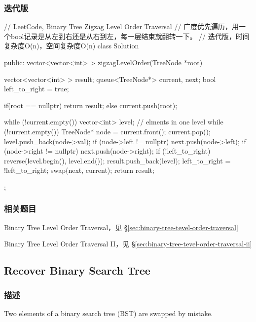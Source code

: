 \subsubsection{迭代版}
\begin{Code}
// LeetCode, Binary Tree Zigzag Level Order Traversal
// 广度优先遍历，用一个bool记录是从左到右还是从右到左，每一层结束就翻转一下。
// 迭代版，时间复杂度O(n)，空间复杂度O(n)
class Solution {
public:
    vector<vector<int> > zigzagLevelOrder(TreeNode *root) {
        vector<vector<int> > result;
        queue<TreeNode*> current, next;
        bool left_to_right = true;
        
        if(root == nullptr) {
            return result;
        } else {
            current.push(root);
        }

        while (!current.empty()) {
            vector<int> level; // elments in one level
            while (!current.empty()) {
                TreeNode* node = current.front();
                current.pop();
                level.push_back(node->val);
                if (node->left != nullptr) next.push(node->left);
                if (node->right != nullptr) next.push(node->right);
            }
            if (!left_to_right) reverse(level.begin(), level.end());
            result.push_back(level);
            left_to_right = !left_to_right;
            swap(next, current);
        }
        return result;
    }
};
\end{Code}


\subsubsection{相关题目}
\begindot
\item Binary Tree Level Order Traversal，见 \S \ref{sec:binary-tree-tevel-order-traversal}
\item Binary Tree Level Order Traversal II，见 \S \ref{sec:binary-tree-tevel-order-traversal-ii}
\myenddot


\subsection{Recover Binary Search Tree}
\label{sec:recover-binary-search-tree}


\subsubsection{描述}
Two elements of a binary search tree (BST) are swapped by mistake.

